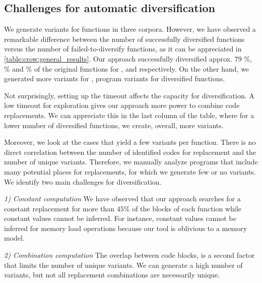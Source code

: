 

\subsection*{Challenges for automatic diversification}



We generate variants for functions in three corpora. However, we have observed a remarkable difference between the number of successfully diversified functions versus the number of failed-to-diversify functions, as it can be appreciated in \autoref{table:crow:general_results}. Our approach successfully diversified approx. 79 \%, \% and \% of the original functions for \corpusrosetta, \corpussodium and \corpusqrcode respectively. On the other hand, we generated more variants for \corpusqrcode, \py{\qrpopulation} program variants for \py{\diversifiedqrcode} diversified functions. 

Not surprisingly, setting up the timeout affects the capacity for diversification. A low timeout for exploration gives our approach more power to combine code replacements. We can appreciate this in the last column of the table, where for a lower number of diversified functions, we create, overall, more variants.

Moreover, we look at the cases that yield a few variants per function. There is no direct correlation between the number of identified codes for replacement and the number of unique variants. Therefore, we manually analyze programs that include many potential places for replacements, for which we generate few or no variants. 
We identify two main challenges for diversification.

\emph{1) Constant computation}  We have observed that our approach searches for a constant replacement for more than $45\%$ of the blocks of each function while constant values cannot be inferred. For instance,  constant values cannot be inferred for memory load operations because our tool is oblivious to a memory model. 


\emph{2) Combination computation}  The overlap between code blocks, is a second factor that limits the number of unique variants. We can generate a high number of variants, but not all replacement combinations are necessarily unique.

